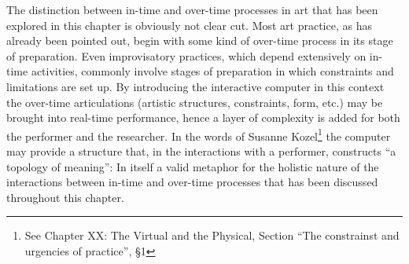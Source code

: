 The distinction between in-time and over-time processes in art that has been explored in this chapter is obviously not clear cut. Most art practice, as has already been pointed out, begin with some kind of over-time process in its stage of preparation. Even improvisatory practices, which depend extensively on in-time activities, commonly involve stages of preparation in which constraints and  limitations are set up. By introducing the interactive computer in this context the over-time articulations (artistic structures, constraints, form, etc.) may be brought into real-time performance, hence a layer of complexity is added for both the performer and the researcher. In the words of Susanne Kozel\footnote{See Chapter XX: The Virtual and the Physical, Section ``The constrainst and urgencies of practice'', \S1} the computer may provide a structure that, in the interactions with a performer, constructs ``a topology of meaning'': In itself a valid metaphor for the holistic nature of the interactions between in-time and over-time processes that has been discussed throughout this chapter.


